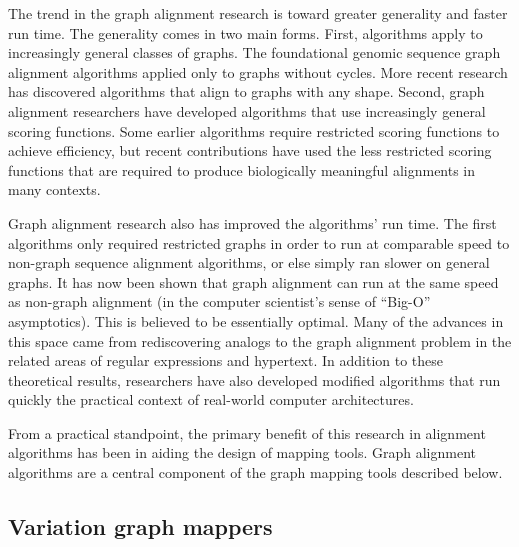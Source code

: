 The trend in the graph alignment research is toward greater generality and faster run time. 
The generality comes in two main forms. 
First, algorithms apply to increasingly general classes of graphs. 
The foundational genomic sequence graph alignment algorithms applied only to graphs without cycles\cite{Lee_2002, Grasso_2004}. 
More recent research has discovered algorithms that align to graphs with any shape\cite{Antipov_2015,Rautiainen_2017,Jain_2019a}. 
Second, graph alignment researchers have developed algorithms that use increasingly general scoring functions. 
Some earlier algorithms require restricted scoring functions to achieve efficiency\cite{Rautiainen_2017}, but recent contributions have used the less restricted scoring functions that are required to produce biologically meaningful alignments in many contexts\cite{Jain_2019a}.

Graph alignment research also has improved the algorithms' run time. 
The first algorithms only required restricted graphs in order to run at comparable speed to non-graph sequence alignment algorithms, or else simply ran slower on general graphs\cite{Lee_2002, Kavya_2019}. 
It has now been shown that graph alignment can run at the same speed as non-graph alignment (in the computer scientist's sense of ``Big-O'' asymptotics). This is believed to be essentially optimal\cite{Jain_2019a,Equi_2019}. 
Many of the advances in this space came from rediscovering analogs to the graph alignment problem in the related areas of regular expressions and hypertext\cite{Myers_1989,Amir_1997}. 
In addition to these theoretical results, researchers have also developed modified algorithms that run quickly the practical context of real-world computer architectures\cite{Suzuki_2018,Rautiainen_2019,Jain_2019b}.

From a practical standpoint, the primary benefit of this research in alignment algorithms has been in aiding the design of mapping tools. 
Graph alignment algorithms are a central component of the graph mapping tools described below.

\subsection{Variation graph mappers}

